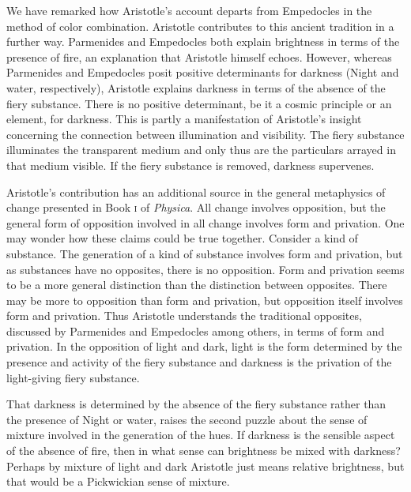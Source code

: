 We have remarked how Aristotle's account departs from Empedocles in the method of color combination. Aristotle contributes to this ancient tradition in a further way. Parmenides and Empedocles both explain brightness in terms of the presence of fire, an explanation that Aristotle himself echoes. However, whereas Parmenides and Empedocles posit positive determinants for darkness (Night and water, respectively), Aristotle explains darkness in terms of the absence of the fiery substance. There is no positive determinant, be it a cosmic principle or an element, for darkness. This is partly a manifestation of Aristotle's insight concerning the connection between illumination and visibility. The fiery substance illuminates the transparent medium and only thus are the particulars arrayed in that medium visible. If the fiery substance is removed, darkness supervenes. 

Aristotle's contribution has an additional source in the general metaphysics of change presented in Book \textsc{i} of \emph{Physica}. All change involves opposition, but the general form of opposition involved in all change involves form and privation. One may wonder how these claims could be true together. Consider a kind of substance. The generation of a kind of substance involves form and privation, but as substances have no opposites, there is no opposition. Form and privation seems to be a more general distinction than the distinction between opposites. There may be more to opposition than form and privation, but opposition itself involves form and privation. Thus Aristotle understands the traditional opposites, discussed by Parmenides and Empedocles among others, in terms of form and privation. In the opposition of light and dark, light is the form determined by the presence and activity of the fiery substance and darkness is the privation of the light-giving fiery substance. 

That darkness is determined by the absence of the fiery substance rather than the presence of Night or water, raises the second puzzle about the sense of mixture involved in the generation of the hues. If darkness is the sensible aspect of the absence of fire, then in what sense can brightness be mixed with darkness? Perhaps by mixture of light and dark Aristotle just means relative brightness, but that would be a Pickwickian sense of mixture. 


